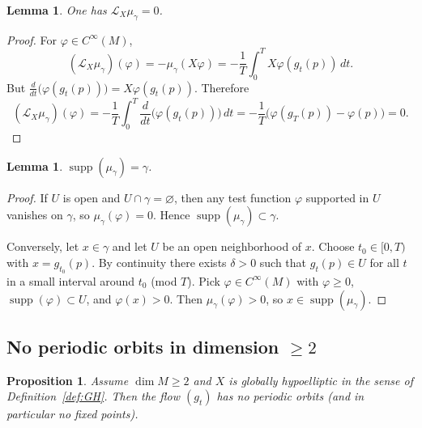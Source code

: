 \documentclass[11pt]{article}
\newtheorem{lemma}[theorem]{Lemma}
\newtheorem{proposition}[theorem]{Proposition}
\theoremstyle{definition}
\theoremstyle{remark}
\newcommand{\Lie}{\mathcal{L}}
\newcommand{\supp}{\operatorname{supp}}
\begin{document}
\begin{lemma}\label{lem:orbit_Lie_zero}
One has $\Lie_X \mu_\gamma=0$.
\end{lemma}

\begin{proof}
For $\varphi\in C^\infty(M)$,
\[
(\Lie_X\mu_\gamma)(\varphi)=-\mu_\gamma(X\varphi)
=-\frac1T\int_0^T X\varphi(g_t(p))\,dt.
\]
But $\frac{d}{dt}\bigl(\varphi(g_t(p))\bigr)=X\varphi(g_t(p))$.
Therefore
\[
(\Lie_X\mu_\gamma)(\varphi)
=-\frac1T\int_0^T \frac{d}{dt}\bigl(\varphi(g_t(p))\bigr)\,dt
=-\frac1T\bigl(\varphi(g_T(p))-\varphi(p)\bigr)=0.
\]
\end{proof}

\begin{lemma}\label{lem:orbit_support}
$\supp(\mu_\gamma)=\gamma$.
\end{lemma}

\begin{proof}
If $U$ is open and $U\cap\gamma=\varnothing$, then any test function $\varphi$ supported in $U$ vanishes on $\gamma$,
so $\mu_\gamma(\varphi)=0$.
Hence $\supp(\mu_\gamma)\subset\gamma$.

Conversely, let $x\in\gamma$ and let $U$ be an open neighborhood of $x$.
Choose $t_0\in[0,T)$ with $x=g_{t_0}(p)$.
By continuity there exists $\delta>0$ such that $g_t(p)\in U$ for all $t$ in a small interval around $t_0$ (mod $T$).
Pick $\varphi\in C^\infty(M)$ with $\varphi\ge 0$, $\supp(\varphi)\subset U$, and $\varphi(x)>0$.
Then $\mu_\gamma(\varphi)>0$, so $x\in\supp(\mu_\gamma)$.
\end{proof}

\subsection{No periodic orbits in dimension $\ge 2$}

\begin{proposition}\label{prop:no_periodic_dimge2}
Assume $\dim M\ge 2$ and $X$ is globally hypoelliptic in the sense of Definition~\ref{def:GH}.
Then the flow $(g_t)$ has no periodic orbits (and in particular no fixed points).
\end{proposition}
\end{document}
